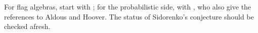 \begin{refsection}
For flag algebras, start with \textcite{Razborov2007}; for the probabilistic side, with \textcite{DiaconisJanson2008}, who also give the references to Aldous and Hoover. The status of Sidorenko's conjecture \parencite{Sidorenko1993,OpenAI2026} should be checked afresh.

\printchapterbib
\end{refsection}
